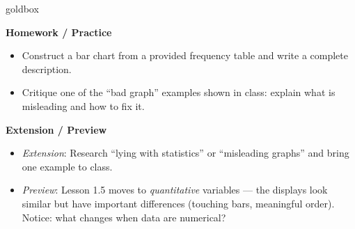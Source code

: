 \documentclass[10pt]{article}
\begin{document}
\begin{skillbox}{goldbox}
\begin{minipage}[t]{0.48\linewidth}
    \textbf{Homework / Practice}
    \begin{itemize}
        \item Construct a bar chart from a provided frequency table and write a complete description.
        \item Critique one of the ``bad graph'' examples shown in class: explain what is misleading and how to fix it.
    \end{itemize}
\end{minipage}
\hfill
\begin{minipage}[t]{0.48\linewidth}
    \textbf{Extension / Preview}
    \begin{itemize}
        \item \textit{Extension}: Research ``lying with statistics'' or ``misleading graphs'' and bring one example to class.
        \item \textit{Preview}: Lesson 1.5 moves to \textit{quantitative} variables --- the displays look similar but have important differences (touching bars, meaningful order). Notice: what changes when data are numerical?
    \end{itemize}
\end{minipage}
\end{skillbox}
\end{document}
